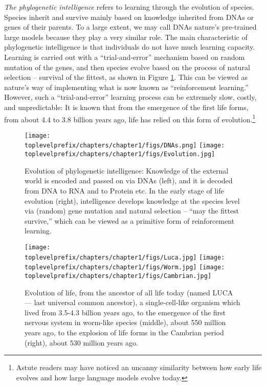 \documentclass[\toplevelprefix/book-main.tex]{subfiles}
\begin{document}
{\em The phylogenetic intelligence} refers to learning through the evolution of species. Species inherit and survive mainly based on knowledge inherited from DNAs or genes of their parents. To a large extent, we may call DNAs nature's pre-trained large models because they play a very similar role.  The main characteristic of phylogenetic intelligence is that individuals do not have much learning capacity. Learning is carried out with a ``trial-and-error'' mechanism based on random mutation of the genes, and then species evolve based on the process of natural selection -- survival of the fittest, as shown in Figure \ref{fig:phylogenetic}.
This can be viewed as nature's way of implementing what is now known as ``reinforcement learning.'' However, such a ``trial-and-error'' learning process can be extremely slow, costly, and unpredictable: It is known that from the emergence of the first life forms, from about 4.4 to 3.8 billion years ago, life has relied on this form of evolution.\footnote{Astute readers may have noticed an uncanny similarity between how early life evolves and how large language models evolve today.} 
\begin{figure}
    \centering
\texttt{[image: \\toplevelprefix/chapters/chapter1/figs/DNAs.png]}
\texttt{[image: \\toplevelprefix/chapters/chapter1/figs/Evolution.jpg]}
    \caption{Evolution of phylogenetic intelligence: Knowledge of the external world is encoded and passed on via DNAs (left), and it is decoded from DNA to RNA and to Protein etc. In the early stage of life evolution (right), intelligence develops knowledge at the species level via (random) gene mutation and natural selection -- ``may the fittest survive,'' which can be viewed as a primitive form of reinforcement learning.}
    \label{fig:phylogenetic}
\end{figure}
\begin{figure}
    \centering
\texttt{[image: \\toplevelprefix/chapters/chapter1/figs/Luca.jpg]}
\texttt{[image: \\toplevelprefix/chapters/chapter1/figs/Worm.jpg]}
\texttt{[image: \\toplevelprefix/chapters/chapter1/figs/Cambrian.jpg]}
    \caption{Evolution of life, from the ancestor of all life today (named LUCA --- last universal common ancestor), a single-cell-like organism which lived from 3.5-4.3 billion years ago, to the emergence of the first nervous system in worm-like species (middle), about 550 million years ago, to the explosion of life forms in the Cambrian period (right), about 530 million years ago.}
    \label{fig:evolution}
\end{figure}
\end{document}
